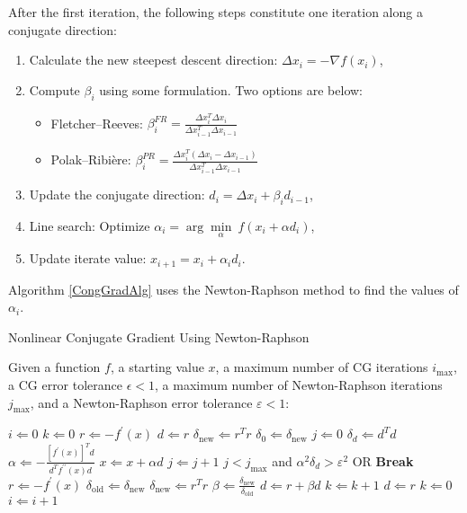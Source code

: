 After the first iteration, the following steps constitute one iteration along a conjugate direction:
\begin{enumerate}
	\item Calculate the new steepest descent direction: $\Delta x_i=-\nabla f(x_i)$,
	\item Compute $\beta_i$ using some formulation. Two options are below:
	\begin{itemize}
		\item Fletcher--Reeves: $\beta_i^{FR}=\frac{\Delta x_i^T\Delta x_i}{\Delta x_{i-1}^T\Delta x_{i-1}}$
		\item Polak--Ribi\`{e}re: $\beta_{i}^{PR}=\frac{\Delta x_i^T(\Delta x_i-\Delta x_{i-1})}{\Delta x_{i-1}^T\Delta x_{i-1}}$
	\end{itemize}
	\item Update the conjugate direction: $d_i=\Delta x_i+\beta_i d_{i-1}$,
	\item Line search: Optimize $\alpha_i =\arg\underset{\alpha}{\min}\ f(x_i+\alpha d_i)$,
	\item Update iterate value: $x_{i+1}=x_i+\alpha_i d_i$.
\end{enumerate}

Algorithm \ref{CongGradAlg} uses the Newton-Raphson method to find the values of $\alpha_i$.

\begin{algorithm}
	\caption{Nonlinear Conjugate Gradient Using Newton-Raphson \cite{Shewchuk1994}\label{CongGradAlg}}
	Given a function $f$, a starting value $x$, a maximum number of CG iterations $i_{\text{max}}$, a CG error tolerance $\epsilon<1$, a maximum number of Newton-Raphson iterations $j_{\text{max}}$, and a Newton-Raphson error tolerance $\varepsilon<1$:
	\begin{algorithmic}
		\State $i\Leftarrow 0$
		\State $k\Leftarrow 0$
		\State $r\Leftarrow -f^{\prime}(x)$
		\State $d\Leftarrow r$
		\State $\delta_{\text{new}}\Leftarrow r^Tr$
		\State $\delta_0\Leftarrow\delta_{\text{new}}$
		\State $j\Leftarrow 0$
		\State $\delta_d\Leftarrow d^Td$
		\State $\alpha\Leftarrow -\frac{\left[f^{\prime}(x)\right]^Td}{d^Tf^{\prime\prime}(x)d}$
		\State $x\Leftarrow x+\alpha d$
		\State $j\Leftarrow j+1$
		\State $j<j_{\text{max}}$ and $\alpha^2\delta_d>\varepsilon^2$ OR \textbf{Break}
		\EndWhile
		\State $r\Leftarrow -f^{\prime}(x)$
		\State $\delta_{\text{old}}\Leftarrow\delta_{\text{new}}$
		\State $\delta_{\text{new}}\Leftarrow r^T r$
		\State $\beta\Leftarrow\frac{\delta_{\text{new}}}{\delta_{\text{old}}}$
		\State $d\Leftarrow r+\beta d$
		\State $k\Leftarrow k+1$
		\State $d\Leftarrow r$
		\State $k\Leftarrow 0$
		\EndIf
		\State $i\Leftarrow i+1$
		\EndWhile
	\end{algorithmic}
\end{algorithm}




